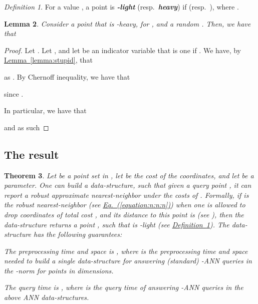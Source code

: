 \documentclass[12pt]{article}\usepackage[cm]{fullpage}
\newcommand{\Term}[1]{\textsf{#1}}
\newcommand{\emphic}[2]{\textcolor{blue25}{\textbf{\emph{#1}}}\index{#2}}
\renewcommand{\emphic}[2]{\textbf{\emph{#1}}}
\newcommand{\emphi}[1]{\emphic{#1}{#1}}
\newtheorem{theorem}{Theorem}[subsection]\newtheorem{lemma}[theorem]{Lemma}\newtheorem{claim}[theorem]{Claim}\newtheorem*{restate*}[theorem]{Restatement of }\newtheorem{corollary}[theorem]{Corollary}
\theoremstyle{remark}\theoremheaderfont{\sf}\theorembodyfont{\upshape}\newtheorem{defn}[theorem]{Definition}
\numberwithin{figure}{section}\numberwithin{table}{section}\numberwithin{equation}{section}
\newcommand{\HLinkPageSuffix}[3]{\hyperref[#2]{#1\ref*{#2}#3}}\newcommand{\HLinkSuffix}[3]{\hyperref[#2]{#1\ref*{#2}{#3}}}
\newcommand{\HLink}[2]{\hyperref[#2]{#1~\ref*{#2}}}
\newcommand{\Eqrefpage}[1]{\HLinkPageSuffix{Eq.~(}{equation:#1}{)}}
\providecommand{\deflab}[1]{\label{def:#1}}
\newcommand{\defref}[1]{\HLink{Definition}{def:#1}}
\newcommand{\lemlab}[1]{\label{lemma:#1}}
\newcommand{\lemref}[1]{\HLink{Lemma}{lemma:#1}}
\newcommand{\thmlab}[1]{{\label{theo:#1}}}
\newcommand{\ANN}{\Term{ANN}\xspace}\newcommand{\NN}{\Term{NN}\xspace}
\begin{document}
\begin{defn}
    \deflab{light:heavy} For a value , a point  is
    \emphi{-light} (resp.~\emphi{heavy}) if
     (resp.~),
    where .
\end{defn}


\begin{lemma}
    \lemlab{stupid2}Consider a point  that is
    -heavy, for , and a
    random . Then, we have that
    
\end{lemma}

\begin{proof}
    Let .  Let
    , and let  be an indicator
    variable that is one if . We have, by
    \lemref{stupid}, that
    
    as .  By Chernoff inequality, we have that
    
    since .

    In particular, we have that
    
    and as such
    
\end{proof}

\subsection{The result}

\begin{theorem}
    \thmlab{main:budgeted} Let  be a point set in , let 
    be the cost of the coordinates, and let  be a
    parameter. One can build a data-structure, such that given a query
    point , it can report a robust approximate
    nearest-neighbor under the costs of . Formally, if
     is the robust nearest-neighbor (see
    \Eqrefpage{n:n:n}) when one is allowed to drop coordinates of
    total cost , and its distance to this point is
     (see ), then the
    data-structure returns a point , such that 
    is -light (see
    \defref{light:heavy}). The data-structure has the following
    guarantees:
    \begin{compactenum}[\qquad(A)]
        \item The preprocessing time and space is
        , where  is the
        preprocessing time and space needed to build a single
        data-structure for answering (standard) -\ANN queries in
        the -norm for  points in  dimensions.

        \item The query time is
        , where  is the
        query time of answering -\ANN queries in the above \ANN
        data-structures.
    \end{compactenum}
\end{theorem}
\end{document}
